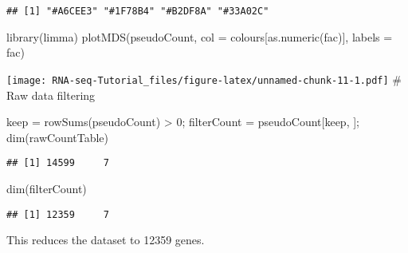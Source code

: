 \documentclass[
]{article}
\newenvironment{Shaded}{\begin{snugshade}}{\end{snugshade}}
\newcommand{\AttributeTok}[1]{\textcolor[rgb]{0.77,0.63,0.00}{#1}}
\newcommand{\DecValTok}[1]{\textcolor[rgb]{0.00,0.00,0.81}{#1}}
\newcommand{\FunctionTok}[1]{\textcolor[rgb]{0.00,0.00,0.00}{#1}}
\newcommand{\NormalTok}[1]{#1}
\newcommand{\OtherTok}[1]{\textcolor[rgb]{0.56,0.35,0.01}{#1}}
\newcommand{\SpecialCharTok}[1]{\textcolor[rgb]{0.00,0.00,0.00}{#1}}
\begin{document}
\begin{verbatim}
## [1] "#A6CEE3" "#1F78B4" "#B2DF8A" "#33A02C"
\end{verbatim}

\begin{Shaded}
\begin{Highlighting}[]
\FunctionTok{library}\NormalTok{(limma)}
\FunctionTok{plotMDS}\NormalTok{(pseudoCount, }\AttributeTok{col =}\NormalTok{ colours[}\FunctionTok{as.numeric}\NormalTok{(fac)], }\AttributeTok{labels =}\NormalTok{ fac)}
\end{Highlighting}
\end{Shaded}

\texttt{[image: RNA-seq-Tutorial\_files/figure-latex/unnamed-chunk-11-1.pdf]}
\# Raw data filtering

\begin{Shaded}
\begin{Highlighting}[]
\NormalTok{keep }\OtherTok{=} \FunctionTok{rowSums}\NormalTok{(pseudoCount) }\SpecialCharTok{\textgreater{}} \DecValTok{0}\NormalTok{;}
\NormalTok{filterCount }\OtherTok{=}\NormalTok{ pseudoCount[keep, ];}
\FunctionTok{dim}\NormalTok{(rawCountTable)}
\end{Highlighting}
\end{Shaded}

\begin{verbatim}
## [1] 14599     7
\end{verbatim}

\begin{Shaded}
\begin{Highlighting}[]
\FunctionTok{dim}\NormalTok{(filterCount)}
\end{Highlighting}
\end{Shaded}

\begin{verbatim}
## [1] 12359     7
\end{verbatim}

This reduces the dataset to 12359 genes.
\end{document}
